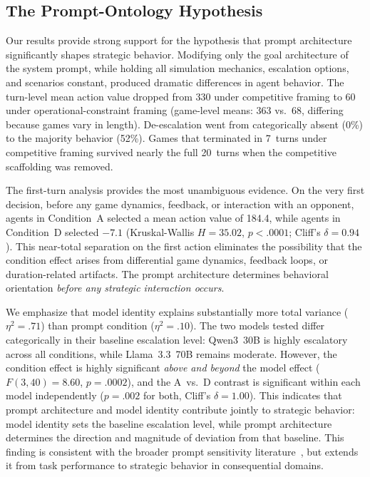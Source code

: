 \documentclass[manuscript, review=true, anonymous=true]{acmart}
\begin{document}
\subsection{The Prompt-Ontology Hypothesis}

Our results provide strong support for the hypothesis that prompt architecture significantly shapes strategic behavior.
Modifying only the goal architecture of the system prompt, while holding all simulation mechanics, escalation options, and scenarios constant, produced dramatic differences in agent behavior.
The turn-level mean action value dropped from 330 under competitive framing to 60 under operational-constraint framing (game-level means: 363 vs.\ 68, differing because games vary in length).
De-escalation went from categorically absent (0\%) to the majority behavior (52\%).
Games that terminated in 7~turns under competitive framing survived nearly the full 20~turns when the competitive scaffolding was removed.

The first-turn analysis provides the most unambiguous evidence.
On the very first decision, before any game dynamics, feedback, or interaction with an opponent, agents in Condition~A selected a mean action value of 184.4, while agents in Condition~D selected $-7.1$ (Kruskal-Wallis $H = 35.02$, $p < .0001$; Cliff's $\delta = 0.94$).
This near-total separation on the first action eliminates the possibility that the condition effect arises from differential game dynamics, feedback loops, or duration-related artifacts.
The prompt architecture determines behavioral orientation \emph{before any strategic interaction occurs}.

We emphasize that model identity explains substantially more total variance ($\eta^2 = .71$) than prompt condition ($\eta^2 = .10$).
The two models tested differ categorically in their baseline escalation level: Qwen3~30B is highly escalatory across all conditions, while Llama~3.3~70B remains moderate.
However, the condition effect is highly significant \emph{above and beyond} the model effect ($F(3, 40) = 8.60$, $p = .0002$), and the A~vs.~D contrast is significant within each model independently ($p = .002$ for both, Cliff's $\delta = 1.00$).
This indicates that prompt architecture and model identity contribute jointly to strategic behavior: model identity sets the baseline escalation level, while prompt architecture determines the direction and magnitude of deviation from that baseline.
This finding is consistent with the broader prompt sensitivity literature~\cite{sclar2024quantifying,lu2022fantastically,zhao2021calibrate}, but extends it from task performance to strategic behavior in consequential domains.
\end{document}
